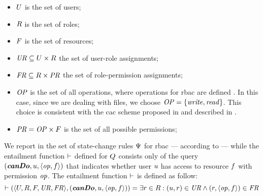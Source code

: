 \begin{itemize}
	\item \( U \) is the set of users;
	\item \( R \) is the set of roles;
	\item \( F \) is the set of resources;
	\item \( \mathit{UR} \subseteq U \times R \) the set of user-role assignments;
	\item \( \mathit{FR} \subseteq R \times \mathit{PR} \) the set of role-permission assignments;
	\item \( \mathit{OP} \) is the set of all operations, where operations for \gls{rbac} are defined  \cite{ANSI_INCITS_359_2004}. In this case, since we are dealing with files, we choose \( \mathit{OP} = \lbrace \mathit{write}, \mathit{read} \rbrace \). This choice is consistent with the \gls{cac} scheme proposed in \cite{cac} and described in .
	\item \( \mathit{PR} = \mathit{OP} \times F \) is the set of all possible permissions;
\end{itemize}

We report in  the set of state-change rules \( \Psi \) for \gls{rbac} --- according to \cite{ANSI_INCITS_359_2004} --- while the entailment function \( \vdash \) defined for \( Q \) consists only of the query \( ( \textbf{\textit{canDo}}, u, \langle \mathit{op}, f \rangle ) \) that indicates whether user \( u \) has access to resource \( f \) with permission \( \mathit{op} \). The entailment function \( \vdash \) is defined as follow: \[ \vdash( \langle U, R, F, \mathit{UR}, \mathit{FR} \rangle, ( \textbf{\textit{canDo}}, u, \langle \mathit{op}, f \rangle )) = \\ \exists r \in R : (u, r) \in \mathit{UR} \land (r, \langle \mathit{op}, f \rangle) \in \mathit{FR} \]



